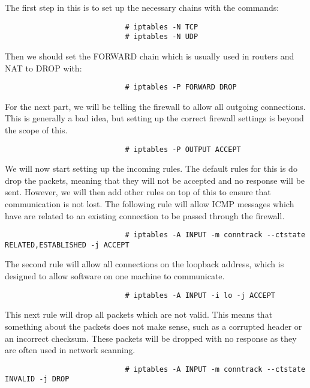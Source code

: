 						The first step in this is to set up the necessary chains with the commands:
						\begin{verbatim}
							# iptables -N TCP
							# iptables -N UDP
						\end{verbatim}
						Then we should set the FORWARD chain which is usually used in routers and NAT to DROP with:
						\begin{verbatim}
							# iptables -P FORWARD DROP
						\end{verbatim}
						For the next part, we will be telling the firewall to allow all outgoing connections.
						This is generally a bad idea, but setting up the correct firewall settings is beyond the scope of this.
						\begin{verbatim}
							# iptables -P OUTPUT ACCEPT
						\end{verbatim}
						We will now start setting up the incoming rules.
						The default rules for this is do drop the packets, meaning that they will not be accepted and no response will be sent.
						However, we will then add other rules on top of this to ensure that communication is not lost.
						The following rule will allow ICMP messages which have are related to an existing connection to be passed through the firewall.
						\begin{verbatim}
							# iptables -A INPUT -m conntrack --ctstate RELATED,ESTABLISHED -j ACCEPT
						\end{verbatim}
						The second rule will allow all connections on the loopback address, which is designed to allow software on one machine to communicate.
						\begin{verbatim}
							# iptables -A INPUT -i lo -j ACCEPT
						\end{verbatim}
						This next rule will drop all packets which are not valid.
						This means that something about the packets does not make sense, such as a corrupted header or an incorrect checksum.
						These packets will be dropped with no response as they are often used in network scanning.
						\begin{verbatim}
							# iptables -A INPUT -m conntrack --ctstate INVALID -j DROP
						\end{verbatim}

